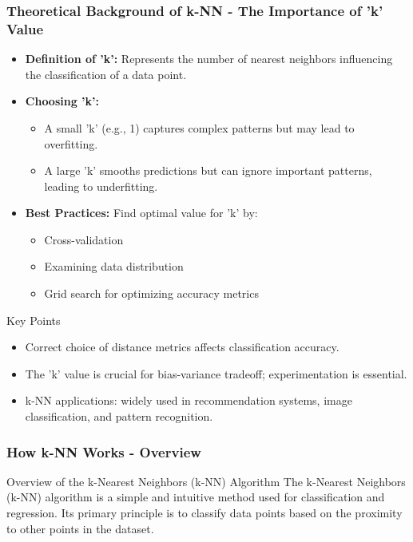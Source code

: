 \documentclass[aspectratio=169]{beamer}
\begin{document}
\begin{frame}[fragile]
    \frametitle{Theoretical Background of k-NN - The Importance of 'k' Value}
    \begin{itemize}
        \item \textbf{Definition of 'k':} Represents the number of nearest neighbors influencing the classification of a data point.
        \item \textbf{Choosing 'k':} 
        \begin{itemize}
            \item A small 'k' (e.g., 1) captures complex patterns but may lead to overfitting.
            \item A large 'k' smooths predictions but can ignore important patterns, leading to underfitting.
        \end{itemize}
        \item \textbf{Best Practices:} Find optimal value for 'k' by:
        \begin{itemize}
            \item Cross-validation
            \item Examining data distribution
            \item Grid search for optimizing accuracy metrics
        \end{itemize}
    \end{itemize}
    
    \begin{block}{Key Points}
        \begin{itemize}
            \item Correct choice of distance metrics affects classification accuracy.
            \item The 'k' value is crucial for bias-variance tradeoff; experimentation is essential.
            \item k-NN applications: widely used in recommendation systems, image classification, and pattern recognition.
        \end{itemize}
    \end{block}
\end{frame}

\begin{frame}[fragile]
    \frametitle{How k-NN Works - Overview}
    \begin{block}{Overview of the k-Nearest Neighbors (k-NN) Algorithm}
        The k-Nearest Neighbors (k-NN) algorithm is a simple and intuitive method used for classification and regression. 
        Its primary principle is to classify data points based on the proximity to other points in the dataset.
    \end{block}
\end{frame}
\end{document}
